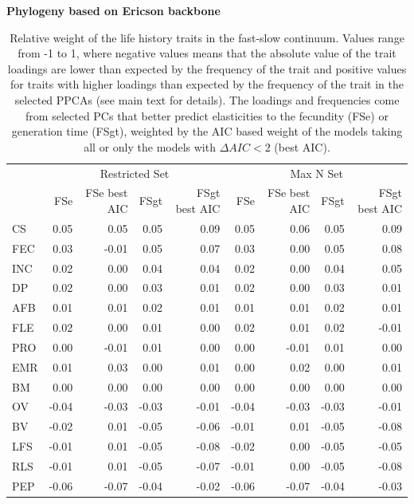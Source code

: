 \clearpage%
\begin{table}
\center
\caption[LHT relative importance of the FS axes]{
Relative weight of the life history traits in the fast-slow continuum. Values
range from -1 to 1, where negative values means that the absolute value of the
trait loadings are lower than expected by the frequency of the trait and
positive values for traits with higher loadings than expected by the frequency
of the trait in the selected PPCAs (see main text for details). The loadings and
frequencies come from selected PCs that better predict elasticities to the
fecundity (FSe) or generation time (FSgt), weighted by the AIC based weight
of the models taking all or only the models with $\Delta AIC < 2$ (best AIC).
}
\label{tab:tabApp2.3}
\begin{footnotesize}

\textbf{Phylogeny based on Ericson backbone}

\begin{tabular}{@{}l|rrrr|rrrr@{}}
\toprule
  & \multicolumn{4}{c|}{Restricted Set} & \multicolumn{4}{c}{Max N Set}\\
  & FSe & FSe best AIC & FSgt & FSgt best AIC & FSe & FSe best AIC & FSgt & FSgt best AIC\\
\midrule
CS & 0.05 & 0.05 & 0.05 & 0.09 & 0.05 & 0.06 & 0.05 & 0.09\\
FEC & 0.03 & -0.01 & 0.05 & 0.07 & 0.03 & 0.00 & 0.05 & 0.08\\
INC & 0.02 & 0.00 & 0.04 & 0.04 & 0.02 & 0.00 & 0.04 & 0.05\\
DP & 0.02 & 0.00 & 0.03 & 0.01 & 0.02 & 0.00 & 0.03 & 0.01\\
AFB & 0.01 & 0.01 & 0.02 & 0.01 & 0.01 & 0.01 & 0.02 & 0.01\\
FLE & 0.02 & 0.00 & 0.01 & 0.00 & 0.02 & 0.01 & 0.02 & -0.01\\
PRO & 0.00 & -0.01 & 0.01 & 0.00 & 0.00 & -0.01 & 0.01 & 0.00\\
EMR & 0.01 & 0.03 & 0.00 & 0.01 & 0.00 & 0.02 & 0.00 & 0.01\\
BM & 0.00 & 0.00 & 0.00 & 0.00 & 0.00 & 0.00 & 0.00 & 0.00\\
OV & -0.04 & -0.03 & -0.03 & -0.01 & -0.04 & -0.03 & -0.03 & -0.01\\
BV & -0.02 & 0.01 & -0.05 & -0.06 & -0.01 & 0.01 & -0.05 & -0.08\\
LFS & -0.01 & 0.01 & -0.05 & -0.08 & -0.02 & 0.00 & -0.05 & -0.05\\
RLS & -0.01 & 0.01 & -0.05 & -0.07 & -0.01 & 0.00 & -0.05 & -0.08\\
PEP & -0.06 & -0.07 & -0.04 & -0.02 & -0.06 & -0.07 & -0.04 & -0.03\\
\bottomrule
\end{tabular}


\end{footnotesize}
\end{table}
